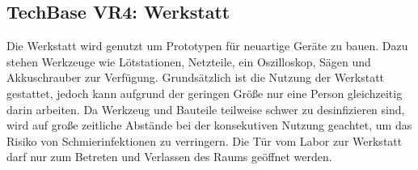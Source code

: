 \subsection{TechBase VR4: Werkstatt}\label{subsec:labore_vr4_werkstatt}


\noindent
Die Werkstatt wird genutzt um Prototypen für neuartige Geräte zu bauen.
Dazu stehen Werkzeuge wie Lötstationen, Netzteile, ein Oszilloskop, Sägen und Akkuschrauber zur Verfügung.
Grundsätzlich ist die Nutzung der Werkstatt gestattet, jedoch kann aufgrund der geringen Größe nur eine Person gleichzeitig darin arbeiten.
Da Werkzeug und Bauteile teilweise schwer zu desinfizieren sind, wird auf große zeitliche Abstände bei der konsekutiven Nutzung geachtet, um das Risiko von Schmierinfektionen zu verringern.
Die Tür vom Labor zur Werkstatt darf nur zum Betreten und Verlassen des Raums geöffnet werden.
